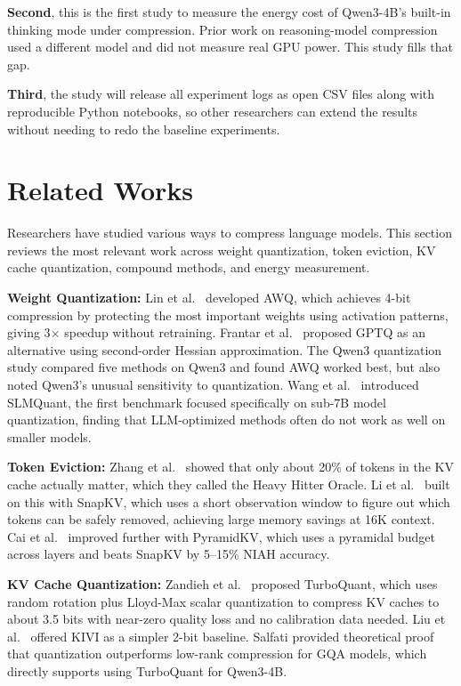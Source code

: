 \documentclass[conference]{IEEEtran}
\begin{document}
\textbf{Second}, this is the first study to measure the energy cost of Qwen3-4B's built-in thinking mode under compression. Prior work on reasoning-model compression \cite{thinkv} used a different model and did not measure real GPU power. This study fills that gap.

\textbf{Third}, the study will release all experiment logs as open CSV files along with reproducible Python notebooks, so other researchers can extend the results without needing to redo the baseline experiments.


\section{Related Works}

Researchers have studied various ways to compress language models. This section reviews the most relevant work across weight quantization, token eviction, KV cache quantization, compound methods, and energy measurement.

\textbf{Weight Quantization:} Lin et al.\ \cite{awq} developed AWQ, which achieves 4-bit compression by protecting the most important weights using activation patterns, giving 3$\times$ speedup without retraining. Frantar et al.\ \cite{gptq} proposed GPTQ as an alternative using second-order Hessian approximation. The Qwen3 quantization study \cite{qwen3quant2025} compared five methods on Qwen3 and found AWQ worked best, but also noted Qwen3's unusual sensitivity to quantization. Wang et al.\ \cite{slmquant} introduced SLMQuant, the first benchmark focused specifically on sub-7B model quantization, finding that LLM-optimized methods often do not work as well on smaller models.

\textbf{Token Eviction:} Zhang et al.\ \cite{h2o} showed that only about 20\% of tokens in the KV cache actually matter, which they called the Heavy Hitter Oracle. Li et al.\ \cite{snapkv} built on this with SnapKV, which uses a short observation window to figure out which tokens can be safely removed, achieving large memory savings at 16K context. Cai et al.\ \cite{pyramidkv} improved further with PyramidKV, which uses a pyramidal budget across layers and beats SnapKV by 5--15\% NIAH accuracy.

\textbf{KV Cache Quantization:} Zandieh et al.\ \cite{turboquant} proposed TurboQuant, which uses random rotation plus Lloyd-Max scalar quantization to compress KV caches to about 3.5 bits with near-zero quality loss and no calibration data needed. Liu et al.\ \cite{kivi} offered KIVI as a simpler 2-bit baseline. Salfati \cite{salfati2026} provided theoretical proof that quantization outperforms low-rank compression for GQA models, which directly supports using TurboQuant for Qwen3-4B.
\end{document}

